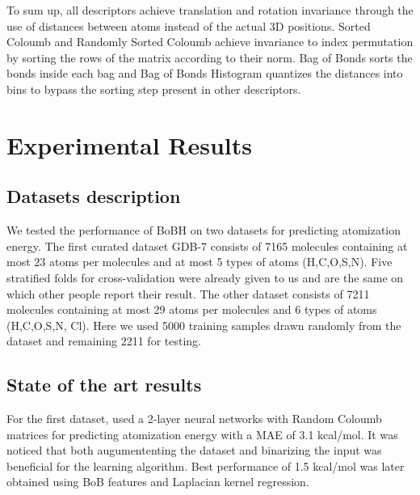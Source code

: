 \documentclass{article}
\begin{document}
To sum up, all descriptors achieve translation and rotation invariance through the use of
distances between atoms instead of the actual 3D positions. Sorted Coloumb and Randomly Sorted Coloumb achieve invariance to index permutation by sorting the rows of the matrix according to their norm. Bag of Bonds sorts the bonds inside each bag and Bag of Bonds Histogram quantizes the distances into bins to bypass the sorting step present in other descriptors.



\section{Experimental Results}

\subsection{Datasets description}
We tested the performance of BoBH on two datasets for predicting atomization energy.
The first curated dataset GDB-7 consists of 7165 molecules containing at most 23 atoms per molecules and at most 5 types of atoms (H,C,O,S,N). Five stratified folds for cross-validation were already given to us and are the same on which other people report their result.
The other dataset consists of 7211 molecules containing at most 29 atoms per molecules and 6 types of atoms (H,C,O,S,N, Cl). Here we used 5000 training samples drawn randomly from the dataset and remaining 2211 for testing.


\subsection{State of the art results}
For the first dataset,  \cite{montavon2012learning} used a 2-layer neural networks with Random Coloumb matrices for predicting atomization energy with a MAE of 3.1 kcal/mol.
It was noticed that both augumententing the dataset and binarizing the input was beneficial for the learning algorithm. Best performance of 1.5 kcal/mol was later obtained using BoB\citep{bob} features and Laplacian kernel regression.
\end{document}
